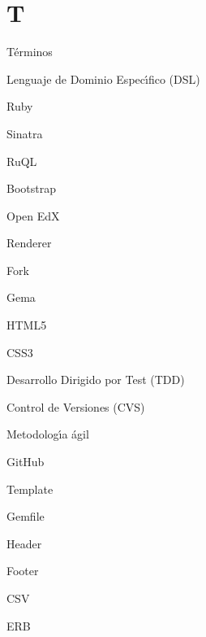 \section{T}
\label{Apendice1:T}

T\'erminos
\bigskip

Lenguaje de Dominio Espec\'{\i}fico (DSL)
\bigskip

Ruby
\bigskip

Sinatra
\bigskip

RuQL
\bigskip

Bootstrap
\bigskip

Open EdX
\bigskip

Renderer
\bigskip

Fork
\bigskip

Gema
\bigskip

HTML5
\bigskip

CSS3
\bigskip

Desarrollo Dirigido por Test (TDD)
\bigskip

Control de Versiones (CVS)
\bigskip

Metodolog\'{\i}a \'agil
\bigskip

GitHub
\bigskip

Template
\bigskip

Gemfile
\bigskip

Header
\bigskip

Footer
\bigskip

CSV
\bigskip

ERB
\bigskip
